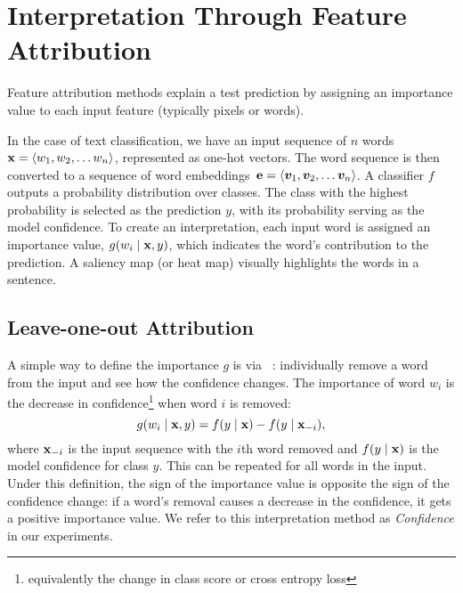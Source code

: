 \section{Interpretation Through Feature Attribution}
\label{sec:saliency_approaches}

Feature attribution methods explain a test prediction
by assigning an importance value to each input
feature (typically pixels or words).

In the case of text classification, we
have an input sequence of $n$ words $\boldsymbol{\mathbf{x}}=\langle w_1, w_2, \ldots
w_n\rangle$, represented as
one-hot vectors. The word sequence is then converted to a sequence of
word embeddings~$\boldsymbol{\mathbf{e}}=\langle\bm{v}_1, \bm{v}_2, \ldots \bm{v}_n\rangle$.
A classifier $f$
outputs a probability distribution over classes.
The class with the highest probability is selected as the prediction $y$, with its
probability serving as the model confidence. To create an interpretation, each input word
is assigned an importance value, $g(w_i \mid \boldsymbol{\mathbf{x}}, y)$, which indicates the word's
contribution to the prediction. A saliency map (or heat map)
visually highlights the words in a sentence.

\subsection{Leave-one-out Attribution}
\label{sec:l10}
A simple way to define the importance $g$ is via \loo{}~\cite{li2016understanding}: individually
remove a word from the input and see how the confidence changes. The importance of
word $w_i$ is the decrease in confidence\footnote{equivalently the change in class score or cross
entropy loss} when word $i$ is removed:
\begin{equation}
\label{eq:importance}
    g(w_i \mid \boldsymbol{\mathbf{x}}, y) = f(y\mid\boldsymbol{\mathbf{x}}) - f(y\mid\boldsymbol{\mathbf{x}}_{-i}),
\end{equation}
where $\boldsymbol{\mathbf{x}}_{-i}$ is the input sequence with the $i$th word removed and
$f(y\mid\boldsymbol{\mathbf{x}})$ is the model confidence for class $y$. This can be repeated for
all words in the input.
Under this definition, the sign of the importance value is
opposite the sign of the confidence change: if a word's removal 
causes a decrease in the confidence, it gets a positive
importance value. 
We refer to this interpretation method as \textit{Confidence} \loo{}
in our experiments.

